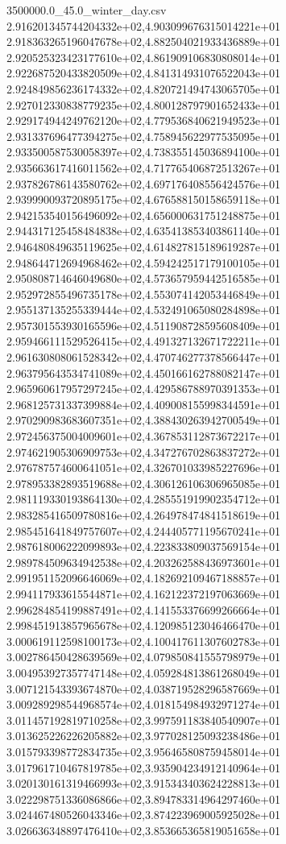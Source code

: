 \begin{filecontents*}{3500000.0_45.0_winter_day.csv}
2.916201345744204332e+02,4.903099676315014221e+01
2.918363265196047678e+02,4.882504021933436889e+01
2.920525323423177610e+02,4.861909106830808014e+01
2.922687520433820509e+02,4.841314931076522043e+01
2.924849856236174332e+02,4.820721494743065705e+01
2.927012330838779235e+02,4.800128797901652433e+01
2.929174944249762120e+02,4.779536840621949523e+01
2.931337696477394275e+02,4.758945622977535095e+01
2.933500587530058397e+02,4.738355145036894100e+01
2.935663617416011562e+02,4.717765406872513267e+01
2.937826786143580762e+02,4.697176408556424576e+01
2.939990093720895175e+02,4.676588150158659118e+01
2.942153540156496092e+02,4.656000631751248875e+01
2.944317125458484838e+02,4.635413853403861140e+01
2.946480849635119625e+02,4.614827815189619287e+01
2.948644712694968462e+02,4.594242517179100105e+01
2.950808714646049680e+02,4.573657959442516585e+01
2.952972855496735178e+02,4.553074142053446849e+01
2.955137135255339444e+02,4.532491065080284898e+01
2.957301553930165596e+02,4.511908728595608409e+01
2.959466111529526415e+02,4.491327132671722211e+01
2.961630808061528342e+02,4.470746277378566447e+01
2.963795643534741089e+02,4.450166162788082147e+01
2.965960617957297245e+02,4.429586788970391353e+01
2.968125731337399884e+02,4.409008155998344591e+01
2.970290983683607351e+02,4.388430263942700549e+01
2.972456375004009601e+02,4.367853112873672217e+01
2.974621905306909753e+02,4.347276702863837272e+01
2.976787574600641051e+02,4.326701033985227696e+01
2.978953382893519688e+02,4.306126106306965085e+01
2.981119330193864130e+02,4.285551919902354712e+01
2.983285416509780816e+02,4.264978474841518619e+01
2.985451641849757607e+02,4.244405771195670241e+01
2.987618006222099893e+02,4.223833809037569154e+01
2.989784509634942538e+02,4.203262588436973601e+01
2.991951152096646069e+02,4.182692109467188857e+01
2.994117933615544871e+02,4.162122372197063669e+01
2.996284854199887491e+02,4.141553376699266664e+01
2.998451913857965678e+02,4.120985123046466470e+01
3.000619112598100173e+02,4.100417611307602783e+01
3.002786450428639569e+02,4.079850841555798979e+01
3.004953927357747148e+02,4.059284813861268049e+01
3.007121543393674870e+02,4.038719528296587669e+01
3.009289298544968574e+02,4.018154984932971274e+01
3.011457192819710258e+02,3.997591183840540907e+01
3.013625226226205882e+02,3.977028125093238486e+01
3.015793398772834735e+02,3.956465808759458014e+01
3.017961710467819785e+02,3.935904234912140964e+01
3.020130161319466993e+02,3.915343403624228813e+01
3.022298751336086866e+02,3.894783314964297460e+01
3.024467480526043346e+02,3.874223969005925028e+01
3.026636348897476410e+02,3.853665365819051658e+01

\end{filecontents*}
